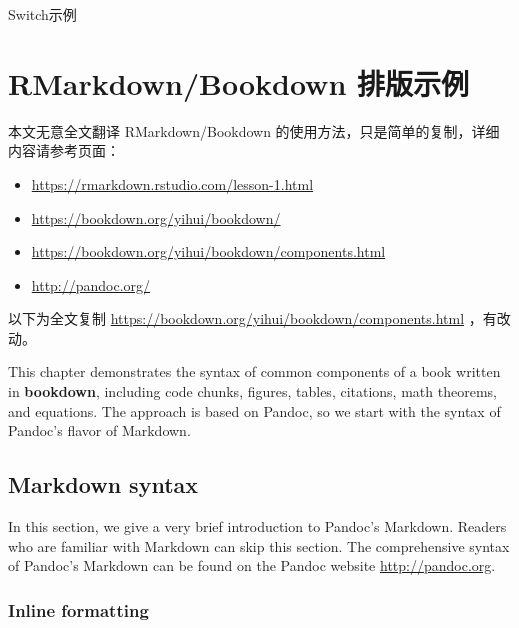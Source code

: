 \documentclass[doctor,openright,twoside]{sjtuthesis}
\providecommand{\tightlist}{%
    \setlength{\itemsep}{0pt}\setlength{\parskip}{0pt}}
\theoremstyle{plain}
\theoremstyle{definition}
\theoremstyle{remark}
\theoremstyle{ocrenumbox}
\theoremstyle{plain}
\begin{document}
\begin{algorithm}
\caption{Switch示例}
\label{algo:switch_example}
\begin{algorithmic}[1]
    \EndCase
    \EndCase
    \Default
    \EndDefault
  \EndSwitch
\end{algorithmic}
\end{algorithm}

\hypertarget{chap:rmarkdown}{%
\chapter{RMarkdown/Bookdown 排版示例}\label{chap:rmarkdown}}

本文无意全文翻译 RMarkdown/Bookdown
的使用方法，只是简单的复制，详细内容请参考页面：

\begin{itemize}
\tightlist
\item
  \url{https://rmarkdown.rstudio.com/lesson-1.html}
\item
  \url{https://bookdown.org/yihui/bookdown/}
\item
  \url{https://bookdown.org/yihui/bookdown/components.html}
\item
  \url{http://pandoc.org/}
\end{itemize}

以下为全文复制 \url{https://bookdown.org/yihui/bookdown/components.html}
，有改动。

This chapter demonstrates the syntax of common components of a book
written in \textbf{bookdown}, including code chunks, figures, tables,
citations, math theorems, and equations. The approach is based on
Pandoc, so we start with the syntax of Pandoc's flavor of
Markdown.

\hypertarget{markdown-syntax}{%
\section{Markdown syntax}\label{markdown-syntax}}

In this section, we give a very brief introduction to Pandoc's
Markdown. Readers who are familiar with Markdown can
skip this section. The comprehensive syntax of Pandoc's Markdown can be
found on the Pandoc website \url{http://pandoc.org}.

\hypertarget{inline-formatting}{%
\subsection{Inline formatting}\label{inline-formatting}}
\end{document}

